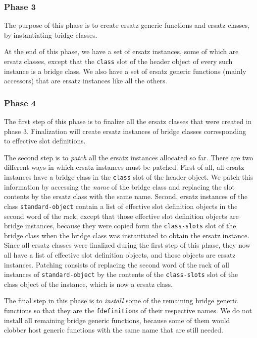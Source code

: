 \subsubsection{Phase 3}

The purpose of this phase is to create ersatz generic functions and
ersatz classes, by instantiating bridge classes.  

At the end of this phase, we have a set of ersatz instances, some of
which are ersatz classes, except that the \texttt{class} slot of the
header object of every such instance is a bridge class.  We also have
a set of ersatz generic functions (mainly accessors) that are ersatz
instances like all the others. 

\subsubsection{Phase 4}

The first step of this phase is to finalize all the ersatz classes
that were created in phase 3.  Finalization will create ersatz
instances of bridge classes corresponding to effective slot
definitions. 

The second step is to \emph{patch} all the ersatz instances allocated
so far.  There are two different ways in which ersatz instances must
be patched.  First of all, all ersatz instances have a bridge class in
the \texttt{class} slot of the header object.  We patch this
information by accessing the \emph{name} of the bridge class and
replacing the slot contents by the ersatz class with the same name.
Second, ersatz instances of the class \texttt{standard-object} contain
a list of effective slot definition objects in the second word of the
rack, except that those effective slot definition objects
are bridge instances, because they were copied form the
\texttt{class-slots} slot of the bridge class when the bridge class
was instantiated to obtain the ersatz instance.  Since all ersatz
classes were finalized during the first step of this phase, they now
all have a list of effective slot definition objects, and those
objects are ersatz instances.  Patching consists of replacing the
second word of the rack of all instances of
\texttt{standard-object} by the contents of the \texttt{class-slots}
slot of the class object of the instance, which is now a ersatz
class. 

The final step in this phase is to \emph{install} some of the
remaining bridge generic functions so that they are the
\texttt{fdefinition}s of their respective names.  We do not install
all remaining bridge generic functions, because some of them would
clobber host generic functions with the same name that are still
needed.  


